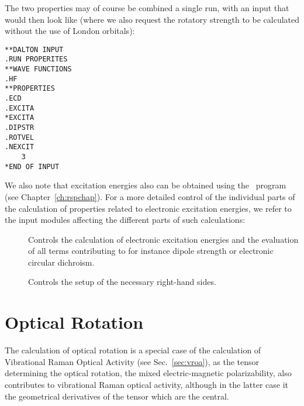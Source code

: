 The two properties may of course be combined a single run, with an
input that would then look like (where we also request the rotatory
strength to be calculated without the use of London orbitals):

\begin{verbatim}
**DALTON INPUT
.RUN PROPERITES
**WAVE FUNCTIONS
.HF
**PROPERTIES
.ECD
.EXCITA
*EXCITA
.DIPSTR
.ROTVEL
.NEXCIT
    3
*END OF INPUT
\end{verbatim}

We also note that excitation energies also can be obtained using the
\resp\ program (see Chapter~\ref{ch:rspchap}).
For a more detailed control of the individual parts of the 
calculation of properties related to electronic excitation energies,
we refer to the input modules affecting the different parts of such
calculations:

\begin{description}
\item[] Controls the calculation of electronic excitation
energies and the evaluation of all terms contributing to for instance
dipole strength or electronic circular dichroism.

\item[] Controls the setup of the necessary right-hand
sides.
\end{description}

\section{Optical Rotation}\label{sec:optrot}

\begin{center}
\end{center}

The calculation of optical rotation is a special case of the
calculation of Vibrational Raman Optical Activity (see
Sec.~\ref{sec:vroa}), as the tensor determining the optical rotation,
the mixed electric-magnetic polarizability, also contributes to
vibrational Raman optical activity, although in the latter case it the
geometrical derivatives of the tensor which are the central.

